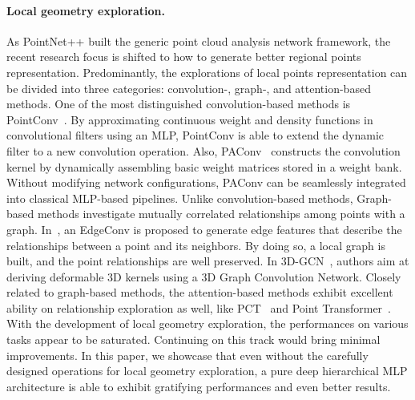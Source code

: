 \documentclass{article} \usepackage{iclr2022_conference,times}
\begin{document}
\paragraph{Local geometry exploration.} As PointNet++ built the generic point cloud analysis network framework, the recent research focus is shifted to how to generate better regional points representation. Predominantly, the explorations of local points representation can be divided into three categories: convolution-, graph-, and attention-based methods. One of the most distinguished convolution-based methods is PointConv~\citep{wu2019pointconv}. By approximating continuous weight and density functions in convolutional filters using an MLP, PointConv is able to extend the dynamic filter to a new convolution operation. Also, PAConv~\citep{xu2021paconv} constructs the convolution kernel by dynamically assembling basic weight matrices stored in a weight bank. Without modifying network configurations, PAConv can be seamlessly integrated into classical MLP-based pipelines. Unlike convolution-based methods, Graph-based methods investigate mutually correlated relationships among points with a graph. In~\citet{wang2019dynamic}, an EdgeConv is proposed to generate edge features that describe the relationships between a point and its neighbors. By doing so, a local graph is built, and the point relationships are well preserved. In 3D-GCN~\citep{lin2021learning}, authors aim at deriving deformable 3D kernels using a 3D Graph Convolution Network. Closely related to graph-based methods, the attention-based methods exhibit excellent ability on relationship exploration as well, like PCT~\citep{guo2021pct} and Point Transformer~\citep{zhao2021point,engel2020point}.
With the development of local geometry exploration, the performances on various tasks appear to be saturated. Continuing on this track would bring minimal improvements. In this paper, we showcase that even without the carefully designed operations for local geometry exploration, a pure deep hierarchical MLP architecture is able to exhibit gratifying performances and even better results. 
\end{document}
